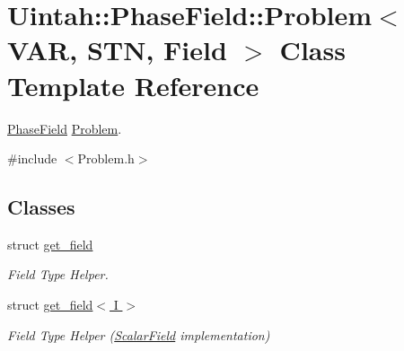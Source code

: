 \hypertarget{classUintah_1_1PhaseField_1_1Problem}{}\section{Uintah\+:\+:Phase\+Field\+:\+:Problem$<$ V\+AR, S\+TN, Field $>$ Class Template Reference}
\label{classUintah_1_1PhaseField_1_1Problem}


\hyperlink{namespaceUintah_1_1PhaseField}{Phase\+Field} \hyperlink{classUintah_1_1PhaseField_1_1Problem}{Problem}.  




{\ttfamily \#include $<$Problem.\+h$>$}

\subsection*{Classes}
\begin{DoxyCompactItemize}
\item 
struct \hyperlink{structUintah_1_1PhaseField_1_1Problem_1_1get__field}{get\+\_\+field}
\begin{DoxyCompactList}\small\item\em Field Type Helper. \end{DoxyCompactList}\item 
struct \hyperlink{structUintah_1_1PhaseField_1_1Problem_1_1get__field_3_01I_01_4}{get\+\_\+field$<$ I $>$}
\begin{DoxyCompactList}\small\item\em Field Type Helper (\hyperlink{structUintah_1_1PhaseField_1_1ScalarField}{Scalar\+Field} implementation) \end{DoxyCompactList}\end{DoxyCompactItemize}
